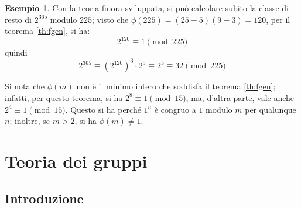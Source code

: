 \documentclass[11pt, a4paper]{scrartcl}
\theoremstyle{definition}
\newtheorem{esempio}{Esempio}
\numberwithin{esempio}{section}
\theoremstyle{definition}
\numberwithin{obs}{section}
\numberwithin{nota}{section}
\numberwithin{equation}{subsection}
\begin{document}
\begin{esempio}
	Con la teoria finora sviluppata, si pu\`o calcolare subito la classe di resto di $2^{365} $ modulo $225$; visto che $\phi (225) = (25-5)(9-3) =120$, per il teorema \ref{th:fgen}, si ha:
	\[
	2^{120} \equiv 1 \pmod{225} 
	\] 
	quindi 
	\[
	2^{365} \equiv (2^{120} )^3 \cdot 2^5 \equiv 2^5 \equiv 32 \pmod{225} 
	\] 
\end{esempio}
Si nota che $\phi (m)$ non \`e il minimo intero che soddisfa il teorema \ref{th:fgen}; infatti, per questo teorema, si ha $2^{8}\equiv 1 \pmod{15} $, ma, d'altra parte, vale anche $2^4 \equiv 1 \pmod{15} $. 
Questo si ha perch\'e $1^n$ \`e congruo a $1$ modulo $m$ per qualunque $n$; inoltre, se $m>2$, si ha $\phi (m) \neq 1$.



















































\newpage

\section{Teoria dei gruppi}
\subsection{Introduzione}
\end{document}

